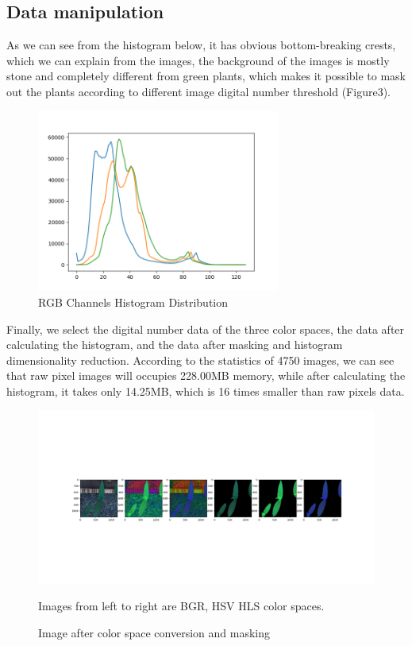 \documentclass[11pt]{article}
\begin{document}
\subsection{Data manipulation}
As we can see from the histogram below, it has obvious bottom-breaking crests, which we can explain from the images, the background of the images is mostly stone and completely different from green plants, which makes it possible to mask out the plants according to different image digital number threshold (Figure3).
\begin{center}
\begin{figure}[htb]
\centering 
\includegraphics[width=8cm]{historgram.png}
\caption{RGB Channels Histogram Distribution}
\end{figure}
\end{center}
Finally, we select the digital number data of the three color spaces, the data after calculating the histogram, and the data after masking and histogram dimensionality reduction. According to the statistics of 4750 images, we can see that raw pixel images will occupies 228.00MB memory, while after calculating the histogram, it takes only 14.25MB, which is 16 times smaller than raw pixels data.
\begin{center}
\begin{figure}[htb]
\centering 
\includegraphics[trim = 50mm 80mm 00mm 80mm, clip=true, width=15cm]{preprocess_images.png}
\caption{Image after color space conversion and masking}
Images from left to right are BGR, HSV HLS color spaces.
\end{figure}
\end{center}
\end{document}
